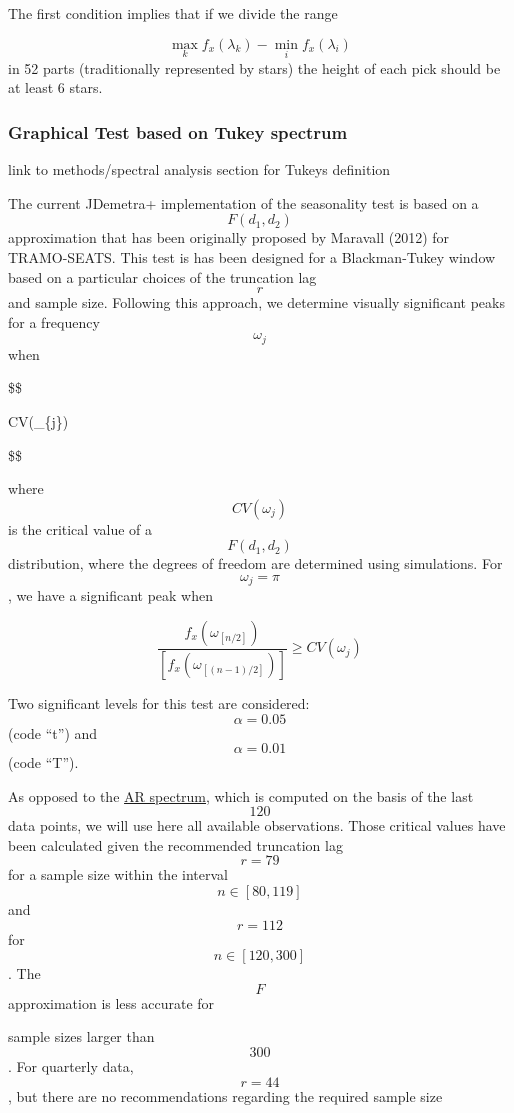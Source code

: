 \documentclass[
  letterpaper,
  DIV=11,
  numbers=noendperiod]{scrreprt}
\begin{document}
The first condition implies that if we divide the range

\[\max_{k}f_{x}(\lambda_{k})-\min_{i}f_{x}(\lambda_{i})\] in 52 parts
(traditionally represented by stars) the height of each pick should be
at least 6 stars.

\hypertarget{graphical-test-based-on-tukey-spectrum}{%
\subsubsection{Graphical Test based on Tukey
spectrum}\label{graphical-test-based-on-tukey-spectrum}}

link to methods/spectral analysis section for Tukeys definition

The current JDemetra+ implementation of the seasonality test is based on
a \[F(d_{1},d_{2})\] approximation that has been originally proposed by
Maravall (2012) for TRAMO-SEATS. This test is has been designed for a
Blackman-Tukey window based on a particular choices of the truncation
lag \[r\] and sample size. Following this approach, we determine
visually significant peaks for a frequency \[\omega_{j}\] when

\$\$

\ge CV(\omega\_\{j\})

\$\$

where \[ CV(\omega_{j})\] is the critical value of a \[F(d_{1},d_{2})\]
distribution, where the degrees of freedom are determined using
simulations. For \[\omega_{j}= \pi\], we have a significant peak when

\[\frac{f_{x}(\omega_{[n/2]})}{\left[ f_{x}(\omega_{[(n-1)/2]})\right]} \ge CV(\omega_{j}) \]

Two significant levels for this test are considered: \[\alpha=0.05\]
(code ``t'') and \[\alpha=0.01\] (code ``T'').

As opposed to the
\href{\%7B\%7B\%20site.baseurl\%20\%7D\%7D/pages/theory/Tests_ARspectrum.html}{AR
spectrum}, which is computed on the basis of the last \[120\] data
points, we will use here all available observations. Those critical
values have been calculated given the recommended truncation lag
\[r=79\] for a sample size within the interval \[n \in [80,119]\] and
\[r=112\] for \[n \in [120,300]\] . The \[F\] approximation is less
accurate for

sample sizes larger than \[300\]. For quarterly data, \[r=44 \], but
there are no recommendations regarding the required sample size
\end{document}
